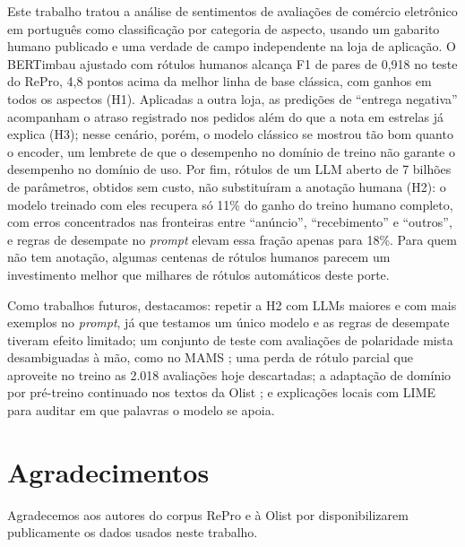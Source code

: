\documentclass[a4paper, twocolumn, 11pt, twoside]{article}
\begin{document}
Este trabalho tratou a análise de sentimentos de avaliações de comércio eletrônico em português como classificação por categoria de aspecto, usando um gabarito humano publicado e uma verdade de campo independente na loja de aplicação. O BERTimbau ajustado com rótulos humanos alcança F1 de pares de 0,918 no teste do RePro, 4,8 pontos acima da melhor linha de base clássica, com ganhos em todos os aspectos (H1). Aplicadas a outra loja, as predições de ``entrega negativa'' acompanham o atraso registrado nos pedidos além do que a nota em estrelas já explica (H3); nesse cenário, porém, o modelo clássico se mostrou tão bom quanto o encoder, um lembrete de que o desempenho no domínio de treino não garante o desempenho no domínio de uso. Por fim, rótulos de um LLM aberto de 7 bilhões de parâmetros, obtidos sem custo, não substituíram a anotação humana (H2): o modelo treinado com eles recupera só 11\% do ganho do treino humano completo, com erros concentrados nas fronteiras entre ``anúncio'', ``recebimento'' e ``outros'', e regras de desempate no \emph{prompt} elevam essa fração apenas para 18\%. Para quem não tem anotação, algumas centenas de rótulos humanos parecem um investimento melhor que milhares de rótulos automáticos deste porte.

Como trabalhos futuros, destacamos: repetir a H2 com LLMs maiores e com mais exemplos no \emph{prompt}, já que testamos um único modelo e as regras de desempate tiveram efeito limitado; um conjunto de teste com avaliações de polaridade mista desambiguadas à mão, como no MAMS \citep{jiang2019mams}; uma perda de rótulo parcial que aproveite no treino as 2.018 avaliações hoje descartadas; a adaptação de domínio por pré-treino continuado nos textos da Olist \citep{gururangan2020dont}; e explicações locais com LIME \citep{ribeiro2016lime} para auditar em que palavras o modelo se apoia.

\section*{Agradecimentos}

Agradecemos aos autores do corpus RePro e à Olist por disponibilizarem publicamente os dados usados neste trabalho.


\end{document}
